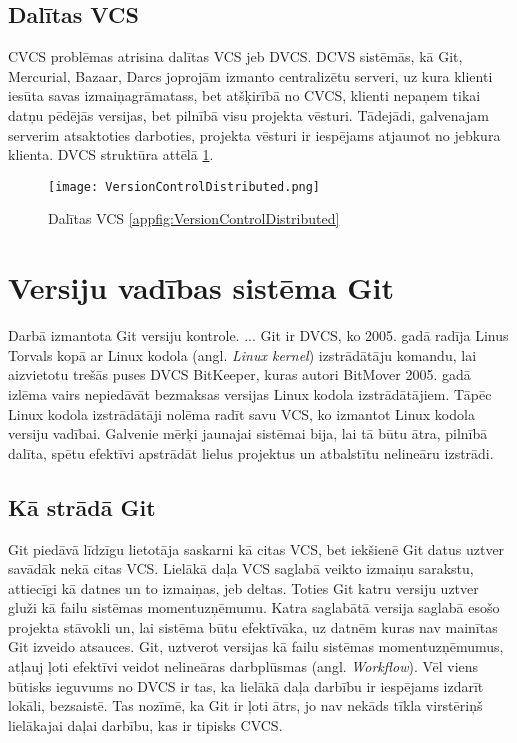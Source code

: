 \subsection{Dalītas VCS}
CVCS problēmas atrisina dalītas VCS jeb DVCS. DCVS sistēmās, kā Git, Mercurial, Bazaar, Darcs joprojām izmanto centralizētu serveri, uz kura klienti iesūta savas izmaiņagrāmatass, bet atšķirībā no CVCS, klienti nepaņem tikai datņu pēdējās versijas, bet pilnībā visu projekta vēsturi. Tādejādi, galvenajam serverim atsaktoties darboties, projekta vēsturi ir iespējams atjaunot no jebkura klienta. DVCS struktūra attēlā \ref{fig:VersionControlDistributed}.
\begin{figure}[H]%
	\centering
	\captionsetup{justification=centering}
	\texttt{[image: VersionControlDistributed.png]}
	\caption{Dalītas VCS \ref{appfig:VersionControlDistributed}}
	\label{fig:VersionControlDistributed}
\end{figure}

\section{Versiju vadības sistēma Git}
Darbā izmantota Git versiju kontrole. ... %
Git ir DVCS, ko 2005. gadā radīja Linus Torvals kopā ar Linux kodola (angl. \textit{Linux kernel}) izstrādātāju komandu, lai aizvietotu trešās puses DVCS BitKeeper, kuras autori BitMover 2005. gadā izlēma vairs nepiedāvāt bezmaksas versijas Linux kodola izstrādātājiem. Tāpēc Linux kodola izstrādātāji nolēma radīt savu VCS, ko izmantot Linux kodola versiju vadībai. Galvenie mērķi jaunajai sistēmai bija, lai tā būtu ātra, pilnībā dalīta, spētu efektīvi apstrādāt lielus projektus un atbalstītu nelineāru izstrādi.

\subsection{Kā strādā Git}
Git piedāvā līdzīgu lietotāja saskarni kā citas VCS, bet iekšienē Git datus uztver savādāk nekā citas VCS. Lielākā daļa VCS saglabā veikto izmaiņu sarakstu, attiecīgi kā datnes un to izmaiņas, jeb deltas.
Toties Git katru versiju uztver gluži kā failu sistēmas momentuzņēmumu. Katra saglabātā versija saglabā esošo projekta stāvokli un, lai sistēma būtu efektīvāka, uz datnēm kuras nav mainītas Git izveido atsauces. Git, uztverot versijas kā failu sistēmas momentuzņēmumus, atļauj ļoti efektīvi veidot nelineāras darbplūsmas (angl. \textit{Workflow}).
Vēl viens būtisks ieguvums no DVCS ir tas, ka lielākā daļa darbību ir iespējams izdarīt lokāli, bezsaistē. Tas nozīmē, ka Git ir ļoti ātrs, jo nav nekāds tīkla virstēriņš lielākajai daļai darbību, kas ir tipisks CVCS.

